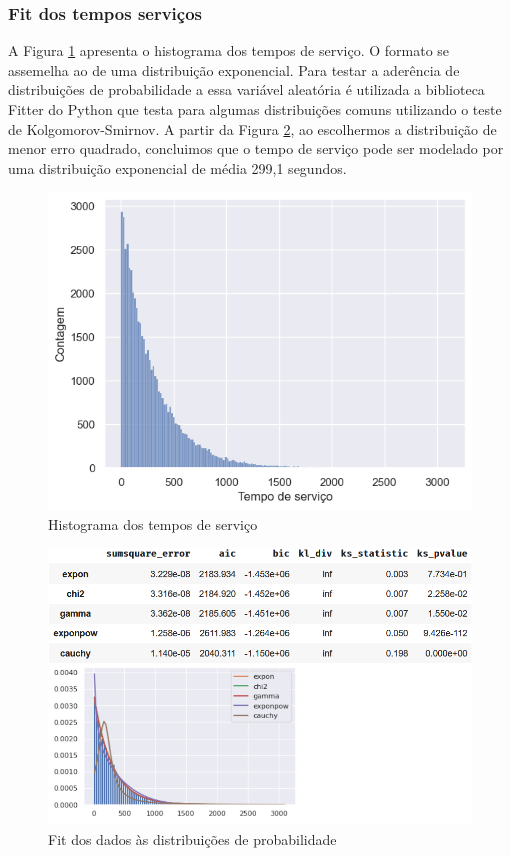 \subsubsection{Fit dos tempos serviços}
A Figura \ref*{fig: hist-servicos} apresenta o histograma dos tempos de serviço. O formato se assemelha ao de uma distribuição exponencial. Para testar a aderência de distribuições de probabilidade a essa variável aleatória é utilizada a biblioteca Fitter do Python que testa para algumas distribuições comuns utilizando o teste de Kolgomorov-Smirnov. A partir da Figura \ref*{fig: fit-servicos}, ao escolhermos a distribuição de menor erro quadrado, concluimos que o tempo de serviço pode ser modelado por uma distribuição exponencial de média 299,1 segundos.

\begin{figure}[H]
    \includegraphics{analise-de-dados/anual/histograma-servicos.png}
    \caption{Histograma dos tempos de serviço}
    \label{fig: hist-servicos}
\end{figure}

\begin{figure}[H]
    \includegraphics[scale=.9]{analise-de-dados/anual/fit-servicos.png}
    \caption{Fit dos dados às distribuições de probabilidade}
    \label{fig: fit-servicos}
\end{figure}


